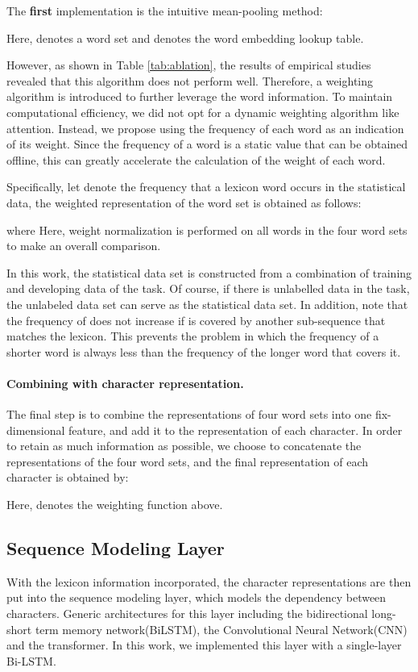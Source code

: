 \documentclass[11pt,a4paper]{article}
\begin{document}
\begin{CJK}{UTF8}{gbsn}
The \textbf{first} implementation is the intuitive mean-pooling method:

Here,  denotes a word set and  denotes the word embedding lookup table. 

However, as shown in Table \ref{tab:ablation}, the results of empirical studies revealed that this algorithm does not perform well. Therefore, a weighting algorithm is introduced to further leverage the word information. To maintain computational efficiency, we did not opt for a dynamic weighting algorithm like attention. 
Instead, we propose using the frequency of each word as an indication of its weight. 
Since the frequency of a word is a static value that can be obtained offline, this can greatly accelerate the calculation of the weight of each word. 

Specifically, let  denote the frequency that a lexicon word  occurs in the statistical data, the weighted representation of the word set  is obtained as follows:

where  Here, weight normalization is performed on all words in the four word sets to make an overall comparison.


In this work, the statistical data set is constructed from a combination of training and developing data of the task. Of course, if there is unlabelled data in the task, the unlabeled data set can serve as the statistical data set. In addition, note that the frequency of  does not increase if  is covered by another sub-sequence that matches the lexicon. This prevents the problem in which the frequency of a shorter word is always less than the frequency of the longer word that covers it.

\paragraph{Combining with character representation.}
The final step is to combine the representations of four word sets into one fix-dimensional feature, and add it to the representation of each character. In order to retain as much information as possible, we choose to concatenate the representations of the four word sets, and the final representation of each character is obtained by:

Here,  denotes the weighting function above.


\subsection{Sequence Modeling Layer} \label{sec:sequence_modeling}
With the lexicon information incorporated, the character representations are then put into the sequence modeling layer, which models the dependency between characters. Generic architectures for this layer including the bidirectional long-short term memory network(BiLSTM), the Convolutional Neural Network(CNN) and the transformer\cite{vaswani2017attention}. In this work, we implemented this layer with a single-layer Bi-LSTM.


\end{CJK}
\end{document}
